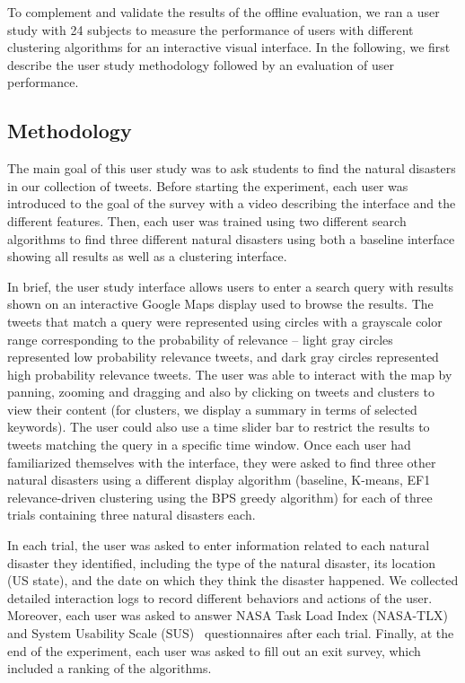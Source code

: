 To complement and validate the results of the offline evaluation,  we ran a user study with 24 subjects to measure the performance of users with different clustering algorithms for an interactive visual interface.  In the following, we first describe the user study methodology followed by an evaluation of user performance.

\subsection{Methodology}
The main goal of this user study was to ask students to find the natural disasters in our collection of tweets. Before starting the experiment, each user was introduced to the goal of the survey with a video describing the interface and the different features. Then, each user was trained using two different search algorithms to find three different natural disasters using both a baseline interface showing all results as well as a clustering interface.

In brief, the user study interface allows users to enter a search query with results shown on an interactive Google Maps display used to browse the results. 
The tweets that match a query were represented using circles with a grayscale color range corresponding to the probability of relevance -- light gray circles represented low probability relevance tweets, and dark gray circles represented high probability relevance tweets.
The user was able to interact with the map by panning, zooming and dragging and also by clicking on tweets and clusters to view their content (for clusters, we display a summary in terms of selected keywords).
The user could also use a time slider bar to restrict the results to tweets matching the query in a specific time window. 
Once each user had familiarized themselves with the interface, they were asked to find three other natural disasters using a different display algorithm (baseline, K-means, EF1 relevance-driven clustering using the BPS greedy algorithm) for each of three trials containing three natural disasters each. 

In each trial, the user was asked to enter information related to each natural disaster they identified, including the type of the natural disaster, its location (US state), and the date on which they think the disaster happened. We collected detailed interaction logs to record different behaviors and actions of the user. Moreover, each user was asked to answer NASA Task Load Index (NASA-TLX)~\cite{HART1988139} and System Usability Scale (SUS)~\cite{brooke1996sus} questionnaires after each trial. Finally, at the end of the experiment, each user was asked to fill out an exit survey, which included a ranking of the algorithms.

